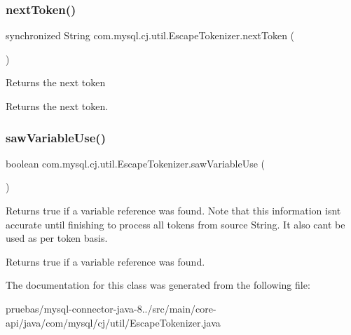 \subsubsection{\texorpdfstring{next\+Token()}{nextToken()}}
{\footnotesize\ttfamily synchronized String com.\+mysql.\+cj.\+util.\+Escape\+Tokenizer.\+next\+Token (\begin{DoxyParamCaption}{ }\end{DoxyParamCaption})}

Returns the next token

\begin{DoxyReturn}{Returns}
the next token. 
\end{DoxyReturn}
\mbox{\label{classcom_1_1mysql_1_1cj_1_1util_1_1_escape_tokenizer_aaccac986d9952cb8c00f2f0d06271022}} 
\subsubsection{\texorpdfstring{saw\+Variable\+Use()}{sawVariableUse()}}
{\footnotesize\ttfamily boolean com.\+mysql.\+cj.\+util.\+Escape\+Tokenizer.\+saw\+Variable\+Use (\begin{DoxyParamCaption}{ }\end{DoxyParamCaption})}

Returns true if a variable reference was found. Note that this information isn\textquotesingle{}t accurate until finishing to process all tokens from source String. It also can\textquotesingle{}t be used as per token basis.

\begin{DoxyReturn}{Returns}
true if a variable reference was found. 
\end{DoxyReturn}


The documentation for this class was generated from the following file\+:\begin{DoxyCompactItemize}
\item 
pruebas/mysql-\/connector-\/java-\/8../src/main/core-\/api/java/com/mysql/cj/util/Escape\+Tokenizer.\+java\end{DoxyCompactItemize}
